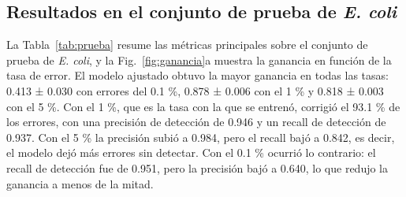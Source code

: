 \documentclass[sigconf,nonacm]{acmart}
\begin{document}
\subsection{Resultados en el conjunto de prueba de \emph{E. coli}}\label{sec:res-prueba}

La Tabla~\ref{tab:prueba} resume las métricas principales sobre el conjunto de prueba de \emph{E. coli}, y la Fig.~\ref{fig:ganancia}a muestra la ganancia en función de la tasa de error. El modelo ajustado obtuvo la mayor ganancia en todas las tasas: 0.413 ± 0.030 con errores del 0.1 \%, 0.878 ± 0.006 con el 1 \% y 0.818 ± 0.003 con el 5 \%. Con el 1 \%, que es la tasa con la que se entrenó, corrigió el 93.1 \% de los errores, con una precisión de detección de 0.946 y un recall de detección de 0.937. Con el 5 \% la precisión subió a 0.984, pero el recall bajó a 0.842, es decir, el modelo dejó más errores sin detectar. Con el 0.1 \% ocurrió lo contrario: el recall de detección fue de 0.951, pero la precisión bajó a 0.640, lo que redujo la ganancia a menos de la mitad.
\end{document}
